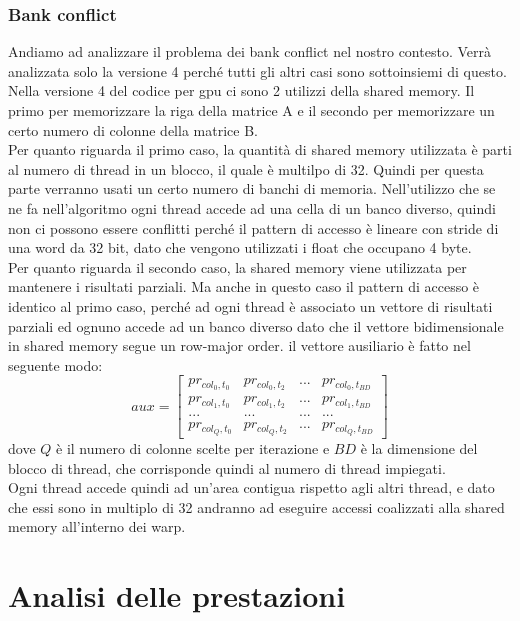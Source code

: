 \documentclass[conference]{IEEEtran}
\begin{document}
\subsubsection{Bank conflict}
Andiamo ad analizzare il problema dei bank conflict nel nostro contesto. Verrà analizzata solo la versione 4 perché tutti gli altri casi sono sottoinsiemi di questo.\\
Nella versione 4 del codice per gpu ci sono 2 utilizzi della shared memory. Il primo per memorizzare la riga della matrice A e il secondo per memorizzare un certo numero di colonne della matrice B.\\
Per quanto riguarda il primo caso, la quantità di shared memory utilizzata è parti al numero di thread in un blocco, il quale è multilpo di 32. Quindi per questa parte verranno usati un certo numero di banchi di memoria. Nell'utilizzo che se ne fa nell'algoritmo ogni thread accede ad una cella di un banco diverso, quindi non ci possono essere conflitti perché il pattern di accesso è lineare con stride di una word da 32 bit, dato che vengono utilizzati i float che occupano 4 byte.\\
Per quanto riguarda il secondo caso, la shared memory viene utilizzata per mantenere i risultati parziali. Ma anche in questo caso il pattern di accesso è identico al primo caso, perché ad ogni thread è associato un vettore di risultati parziali ed ognuno accede ad un banco diverso dato che il vettore bidimensionale in shared memory segue un row-major order. il vettore ausiliario è fatto nel seguente modo:
\[
aux = \left[
\begin{matrix}
pr_{col_0, t_0} & pr_{col_0, t_2} & ... & pr_{col_0, t_{BD}} \\
pr_{col_1, t_0} & pr_{col_1, t_2} & ... & pr_{col_1, t_{BD}} \\
... & ... & ... & ... \\
pr_{col_{Q}, t_0} & pr_{col_{Q}, t_2} & ... & pr_{col_{Q}, t_{BD}}
\end{matrix}\right]
\]
dove $Q$ è il numero di colonne scelte per iterazione e $BD$ è la dimensione del blocco di thread, che corrisponde quindi al numero di thread impiegati.\\
Ogni thread accede quindi ad un'area contigua rispetto agli altri thread, e dato che essi sono in multiplo di 32 andranno ad eseguire accessi coalizzati alla shared memory all'interno dei warp.

\section{Analisi delle prestazioni}
\end{document}
